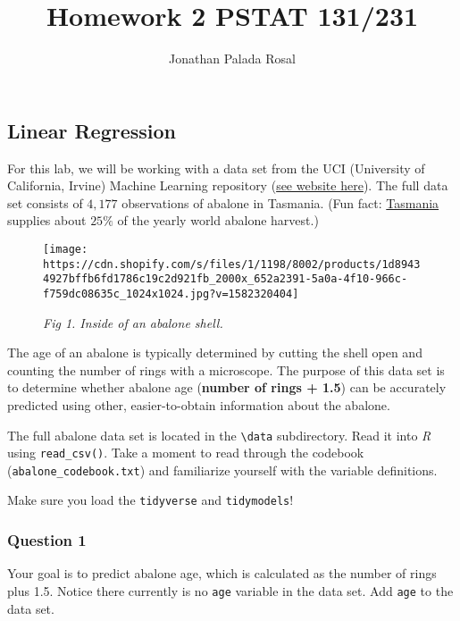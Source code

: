 \documentclass[
]{article}
\title{Homework 2 PSTAT 131/231}
\author{Jonathan Palada Rosal}
\date{}
\begin{document}
\maketitle

{
\setcounter{tocdepth}{2}
\tableofcontents
}
\hypertarget{linear-regression}{%
\subsection{Linear Regression}\label{linear-regression}}

For this lab, we will be working with a data set from the UCI
(University of California, Irvine) Machine Learning repository
(\href{http://archive.ics.uci.edu/ml/datasets/Abalone}{see website
here}). The full data set consists of \(4,177\) observations of abalone
in Tasmania. (Fun fact:
\href{https://en.wikipedia.org/wiki/Tasmania}{Tasmania} supplies about
\(25\%\) of the yearly world abalone harvest.)

\begin{figure}
\centering
\texttt{[image: https://cdn.shopify.com/s/files/1/1198/8002/products/1d89434927bffb6fd1786c19c2d921fb\_2000x\_652a2391-5a0a-4f10-966c-f759dc08635c\_1024x1024.jpg?v=1582320404]}
\caption{\emph{Fig 1. Inside of an abalone shell.}}
\end{figure}

The age of an abalone is typically determined by cutting the shell open
and counting the number of rings with a microscope. The purpose of this
data set is to determine whether abalone age (\textbf{number of rings +
1.5}) can be accurately predicted using other, easier-to-obtain
information about the abalone.

The full abalone data set is located in the
\texttt{\textbackslash{}data} subdirectory. Read it into \emph{R} using
\texttt{read\_csv()}. Take a moment to read through the codebook
(\texttt{abalone\_codebook.txt}) and familiarize yourself with the
variable definitions.

Make sure you load the \texttt{tidyverse} and \texttt{tidymodels}!

\hypertarget{question-1}{%
\subsubsection{Question 1}\label{question-1}}

Your goal is to predict abalone age, which is calculated as the number
of rings plus 1.5. Notice there currently is no \texttt{age} variable in
the data set. Add \texttt{age} to the data set.
\end{document}
